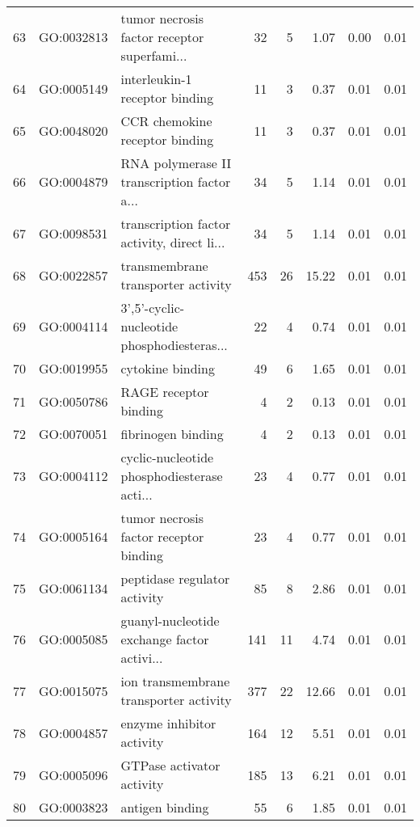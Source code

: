 \begin{table}[ht]
\begin{tabular}{rllrrrrr}
  63 & GO:0032813 & tumor necrosis factor receptor superfami... &  32 &   5 & 1.07 & 0.00 & 0.01 \\ 
  64 & GO:0005149 & interleukin-1 receptor binding &  11 &   3 & 0.37 & 0.01 & 0.01 \\ 
  65 & GO:0048020 & CCR chemokine receptor binding &  11 &   3 & 0.37 & 0.01 & 0.01 \\ 
  66 & GO:0004879 & RNA polymerase II transcription factor a... &  34 &   5 & 1.14 & 0.01 & 0.01 \\ 
  67 & GO:0098531 & transcription factor activity, direct li... &  34 &   5 & 1.14 & 0.01 & 0.01 \\ 
  68 & GO:0022857 & transmembrane transporter activity & 453 &  26 & 15.22 & 0.01 & 0.01 \\ 
  69 & GO:0004114 & 3',5'-cyclic-nucleotide phosphodiesteras... &  22 &   4 & 0.74 & 0.01 & 0.01 \\ 
  70 & GO:0019955 & cytokine binding &  49 &   6 & 1.65 & 0.01 & 0.01 \\ 
  71 & GO:0050786 & RAGE receptor binding &   4 &   2 & 0.13 & 0.01 & 0.01 \\ 
  72 & GO:0070051 & fibrinogen binding &   4 &   2 & 0.13 & 0.01 & 0.01 \\ 
  73 & GO:0004112 & cyclic-nucleotide phosphodiesterase acti... &  23 &   4 & 0.77 & 0.01 & 0.01 \\ 
  74 & GO:0005164 & tumor necrosis factor receptor binding &  23 &   4 & 0.77 & 0.01 & 0.01 \\ 
  75 & GO:0061134 & peptidase regulator activity &  85 &   8 & 2.86 & 0.01 & 0.01 \\ 
  76 & GO:0005085 & guanyl-nucleotide exchange factor activi... & 141 &  11 & 4.74 & 0.01 & 0.01 \\ 
  77 & GO:0015075 & ion transmembrane transporter activity & 377 &  22 & 12.66 & 0.01 & 0.01 \\ 
  78 & GO:0004857 & enzyme inhibitor activity & 164 &  12 & 5.51 & 0.01 & 0.01 \\ 
  79 & GO:0005096 & GTPase activator activity & 185 &  13 & 6.21 & 0.01 & 0.01 \\ 
  80 & GO:0003823 & antigen binding &  55 &   6 & 1.85 & 0.01 & 0.01 \\ 
   \hline
\end{tabular}
\end{table}
